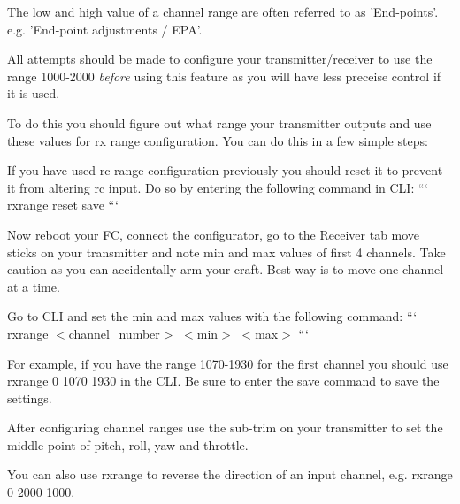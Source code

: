 The low and high value of a channel range are often referred to as 'End-\/points'. e.\+g. 'End-\/point adjustments / E\+P\+A'.

All attempts should be made to configure your transmitter/receiver to use the range 1000-\/2000 {\itshape before} using this feature as you will have less preceise control if it is used.

To do this you should figure out what range your transmitter outputs and use these values for rx range configuration. You can do this in a few simple steps\+:

If you have used rc range configuration previously you should reset it to prevent it from altering rc input. Do so by entering the following command in C\+L\+I\+: ``` rxrange reset save ```

Now reboot your F\+C, connect the configurator, go to the {\ttfamily Receiver} tab move sticks on your transmitter and note min and max values of first 4 channels. Take caution as you can accidentally arm your craft. Best way is to move one channel at a time.

Go to C\+L\+I and set the min and max values with the following command\+: ``` rxrange $<$channel\+\_\+number$>$ $<$min$>$ $<$max$>$ ```

For example, if you have the range 1070-\/1930 for the first channel you should use {\ttfamily rxrange 0 1070 1930} in the C\+L\+I. Be sure to enter the {\ttfamily save} command to save the settings.

After configuring channel ranges use the sub-\/trim on your transmitter to set the middle point of pitch, roll, yaw and throttle.

You can also use rxrange to reverse the direction of an input channel, e.\+g. {\ttfamily rxrange 0 2000 1000}. 